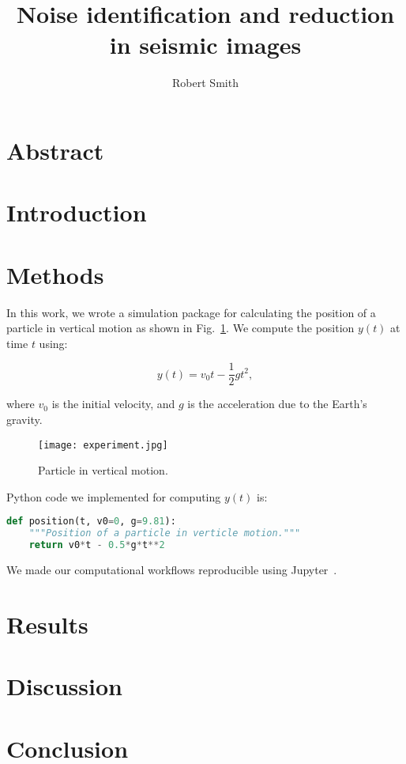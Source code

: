 \documentclass[project-plan]{report-template}
\title{Noise identification and reduction in seismic images}
\author{Robert Smith}
\begin{document}
\maketitlepage  %

\section*{Abstract}
\blindtext  %

\newpage
\tableofcontents
\newpage

\section{Introduction}
\blindtext[3]

\section{Methods}
In this work, we wrote a simulation package for calculating the position of a particle in vertical motion as shown in Fig.~\ref{fig:experiment}. We compute the position $y(t)$ at time $t$ using:

\begin{equation}
    \label{eq:vertical-position}
    y(t) = v_{0}t - \frac{1}{2}gt^{2},
\end{equation}

where $v_{0}$ is the initial velocity, and $g$ is the acceleration due to the Earth's gravity.

\begin{figure}
    \begin{center}
        \texttt{[image: experiment.jpg]}
    \end{center}
    \caption{\label{fig:experiment} Particle in vertical motion.}
\end{figure}

Python code we implemented for computing $y(t)$ is:

\begin{lstlisting}[language=Python]
def position(t, v0=0, g=9.81):
    """Position of a particle in verticle motion."""
    return v0*t - 0.5*g*t**2
\end{lstlisting}

We made our computational workflows reproducible using Jupyter~\cite{Beg2021}.

\section{Results}
\blindtext[3]

\section{Discussion}
\blindtext[2]

\section{Conclusion}
\blindtext[2]


\end{document}
